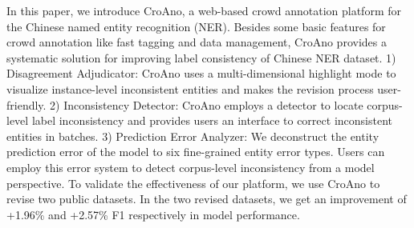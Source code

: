  In this paper, we introduce CroAno, a web-based crowd annotation platform for the Chinese named entity recognition (NER).
Besides some basic features for crowd annotation like fast tagging and data management, CroAno provides a systematic solution for improving label consistency of Chinese NER dataset. 1) Disagreement Adjudicator: CroAno uses a multi-dimensional highlight mode to visualize instance-level inconsistent entities and makes the revision process user-friendly. 2) Inconsistency Detector: CroAno employs a detector to locate corpus-level label inconsistency and provides users an interface to correct inconsistent entities in batches. 3) Prediction Error Analyzer: We deconstruct the entity prediction error of the model to six fine-grained entity error types. Users can employ this error system to detect corpus-level inconsistency from a model perspective. To validate the effectiveness of our platform, we use CroAno to revise two public datasets. In the two revised datasets, we get an improvement of +1.96\% and +2.57\% F1 respectively in model performance.